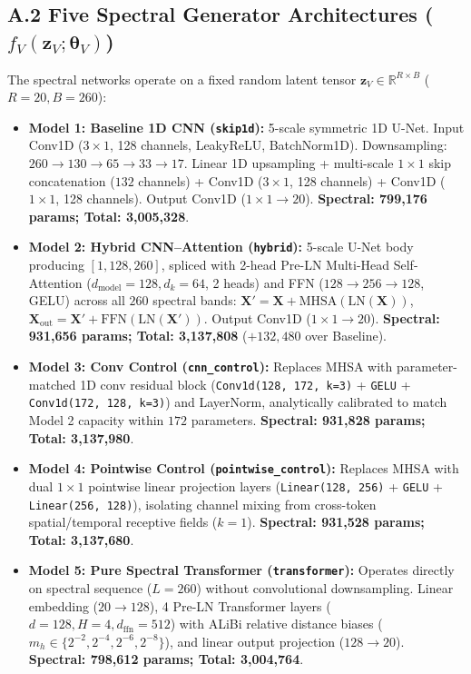 \subsection*{A.2 Five Spectral Generator Architectures ($f_V(\mathbf{z}_V; \boldsymbol{\theta}_V)$)}
The spectral networks operate on a fixed random latent tensor $\mathbf{z}_V \in \mathbb{R}^{R \times B}$ ($R=20, B=260$):
\begin{itemize}[noitemsep, topsep=1pt]
    \item \textbf{Model 1: Baseline 1D CNN (\texttt{skip1d}):} 5-scale symmetric 1D U-Net. Input Conv1D ($3 \times 1$, 128 channels, LeakyReLU, BatchNorm1D). Downsampling: $260 \to 130 \to 65 \to 33 \to 17$. Linear 1D upsampling + multi-scale $1 \times 1$ skip concatenation ($132$ channels) + Conv1D ($3 \times 1$, 128 channels) + Conv1D ($1 \times 1$, 128 channels). Output Conv1D ($1 \times 1 \to 20$). \textbf{Spectral: 799,176 params; Total: 3,005,328}.
    \item \textbf{Model 2: Hybrid CNN--Attention (\texttt{hybrid}):} 5-scale U-Net body producing $[1, 128, 260]$, spliced with 2-head Pre-LN Multi-Head Self-Attention ($d_\text{model}=128, d_k=64$, 2 heads) and FFN ($128 \to 256 \to 128$, GELU) across all $260$ spectral bands: $\mathbf{X}' = \mathbf{X} + \text{MHSA}(\text{LN}(\mathbf{X}))$, $\mathbf{X}_\text{out} = \mathbf{X}' + \text{FFN}(\text{LN}(\mathbf{X}'))$. Output Conv1D ($1 \times 1 \to 20$). \textbf{Spectral: 931,656 params; Total: 3,137,808} ($+132,480$ over Baseline).
    \item \textbf{Model 3: Conv Control (\texttt{cnn\_control}):} Replaces MHSA with parameter-matched 1D conv residual block (\texttt{Conv1d(128, 172, k=3)} + \texttt{GELU} + \texttt{Conv1d(172, 128, k=3)}) and LayerNorm, analytically calibrated to match Model 2 capacity within $172$ parameters. \textbf{Spectral: 931,828 params; Total: 3,137,980}.
    \item \textbf{Model 4: Pointwise Control (\texttt{pointwise\_control}):} Replaces MHSA with dual $1 \times 1$ pointwise linear projection layers (\texttt{Linear(128, 256)} + \texttt{GELU} + \texttt{Linear(256, 128)}), isolating channel mixing from cross-token spatial/temporal receptive fields ($k=1$). \textbf{Spectral: 931,528 params; Total: 3,137,680}.
    \item \textbf{Model 5: Pure Spectral Transformer (\texttt{transformer}):} Operates directly on spectral sequence ($L=260$) without convolutional downsampling. Linear embedding ($20 \to 128$), 4 Pre-LN Transformer layers ($d=128, H=4, d_\text{ffn}=512$) with ALiBi relative distance biases ($m_h \in \{2^{-2}, 2^{-4}, 2^{-6}, 2^{-8}\}$), and linear output projection ($128 \to 20$). \textbf{Spectral: 798,612 params; Total: 3,004,764}.
\end{itemize}


